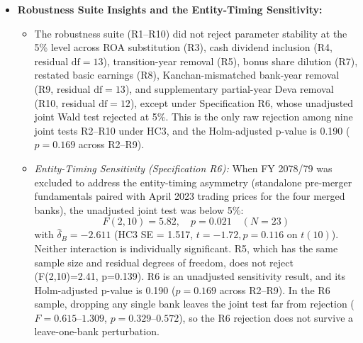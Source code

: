 \begin{itemize}
\begin{itemize}
        \item \textit{Implied Post-Consolidation Slopes:} The implied post-consolidation point estimates are $\hat{\beta}_E + \hat{\delta}_E = 2.453$ ($p = 0.298$) and $\hat{\beta}_B + \hat{\delta}_B = -1.658$ ($p = 0.161$). These estimates are imprecise and do not establish a decline in either slope or a negative book-value association.
        \item \textit{Principal Joint Wald Test:} The joint test of parameter stability ($H_0: \delta_E = \delta_B = 0$) yielded $F(2, 14) = 2.954$ ($p = 0.085$) under the pre-specified HC3 covariance. Under the designated 5\% threshold, the baseline model does not reject parameter stability under HC3, though it achieves marginal significance at the 10\% level. The same test rejects at 5\% under the classical, HC0, HC1 and HC2 covariances for all eight specifications R2--R9 (Chapter IV, Table~\ref{tab:cov_sensitivity}), so the baseline non-rejection is specific to the HC3 estimator.
    \end{itemize}
    \item \textbf{Robustness Suite Insights and the Entity-Timing Sensitivity:}
    \begin{itemize}
        \item The robustness suite (R1--R10) did not reject parameter stability at the 5\% level across ROA substitution (R3), cash dividend inclusion (R4, residual $\text{df} = 13$), transition-year removal (R5), bonus share dilution (R7), restated basic earnings (R8), Kanchan-mismatched bank-year removal (R9, residual $\text{df} = 13$), and supplementary partial-year Deva removal (R10, residual $\text{df} = 12$), except under Specification R6, whose unadjusted joint Wald test rejected at 5\%. This is the only raw rejection among nine joint tests R2--R10 under HC3, and the Holm-adjusted p-value is 0.190 ($p = 0.169$ across R2--R9).
        \item \textit{Entity-Timing Sensitivity (Specification R6):} When FY 2078/79 was excluded to address the entity-timing asymmetry (standalone pre-merger fundamentals paired with April 2023 trading prices for the four merged banks), the unadjusted joint test was below 5\%:
        \begin{equation}
        F(2, 10) = 5.82, \quad p = 0.021 \quad (N = 23)
        \end{equation}
        with $\hat{\delta}_B = -2.611$ (HC3 SE = 1.517, $t = -1.72, p = 0.116$ on $t(10)$). Neither interaction is individually significant. R5, which has the same sample size and residual degrees of freedom, does not reject (F(2,10)=2.41, p=0.139). R6 is an unadjusted sensitivity result, and its Holm-adjusted p-value is 0.190 ($p = 0.169$ across R2--R9). In the R6 sample, dropping any single bank leaves the joint test far from rejection ($F = 0.615$--$1.309$, $p = 0.329$--$0.572$), so the R6 rejection does not survive a leave-one-bank perturbation.

\end{itemize}
\end{itemize}
